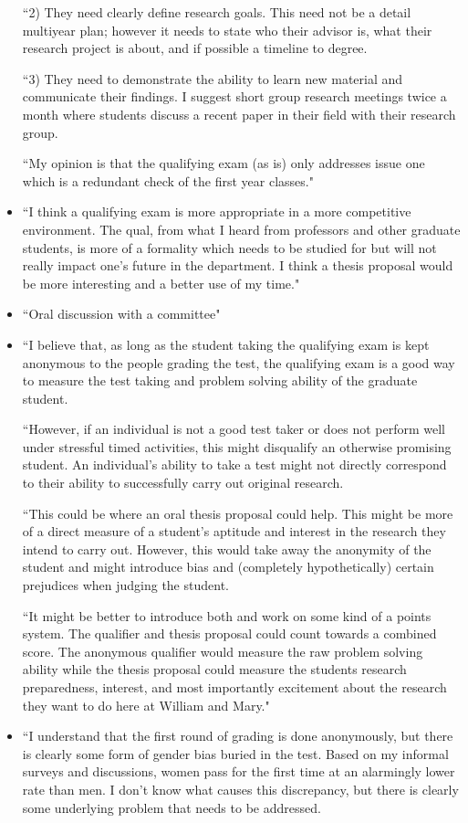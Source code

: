 \documentclass[oneside]{book}   %
\begin{document}
\begin{itemize}
``2) They need clearly define research goals. This need not be a detail multiyear plan; however it needs to state who their advisor is, what their research project is about, and if possible a timeline to degree.

``3) They need to demonstrate the ability to learn new material and communicate their findings. I suggest short group research meetings twice a month where students discuss a recent paper in their field with their research group.

``My opinion is that the qualifying exam (as is) only addresses issue one which is a redundant check of the first year classes."
	\item ``I think a qualifying exam is more appropriate in a more competitive environment. The qual, from what I heard from professors and other graduate students, is more of a formality which needs to be studied for but will not really impact one's future in the department. I think a thesis proposal would be more interesting and a better use of my time."
	\item ``Oral discussion with a committee"
	\item ``I believe that, as long as the student taking the qualifying exam is kept anonymous to the people grading the test, the qualifying exam is a good way to measure the test taking and problem solving ability of the graduate student.

``However, if an individual is not a good test taker or does not perform well under stressful timed activities, this might disqualify an otherwise promising student. An individual's ability to take a test might not directly correspond to their ability to successfully carry out original research.

``This could be where an oral thesis proposal could help. This might be more of a direct measure of a student's aptitude and interest in the research they intend to carry out. However, this would take away the anonymity of the student and might introduce bias and (completely hypothetically) certain prejudices when judging the student.

``It might be better to introduce both and work on some kind of a points system. The qualifier and thesis proposal could count towards a combined score. The anonymous qualifier would measure the raw problem solving ability while the thesis proposal could measure the students research preparedness, interest, and most importantly excitement about the research they want to do here at William and Mary."
	\item ``I understand that the first round of grading is done anonymously, but there is clearly some form of gender bias buried in the test. Based on my informal surveys and discussions, women pass for the first time at an alarmingly lower rate than men. I don't know what causes this discrepancy, but there is clearly some underlying problem that
needs to be addressed.


\end{itemize}
\end{document}
